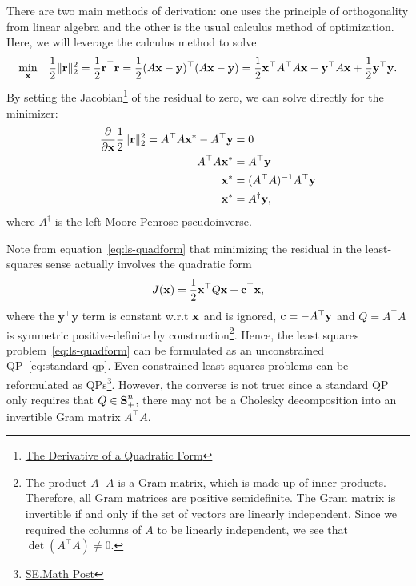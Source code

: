 \documentclass[10pt]{article}
\begin{document}
There are two main methods of derivation: one uses the principle of orthogonality from linear algebra and the other is the usual calculus method of optimization.
Here, we will leverage the calculus method to solve
\begin{equation}\label{eq:ls-quadform}
\underset{\mathbf{x}}{\min}\quad \frac{1}{2}\|\mathbf{r}\|^2_2 = \frac{1}{2}\mathbf{r}^\top\mathbf{r}
= \frac{1}{2}(A\mathbf{x}-\mathbf{y})^\top(A\mathbf{x}-\mathbf{y})
= \frac{1}{2} \mathbf{x}^\top A^\top A\mathbf{x} - \mathbf{y}^\top A\mathbf{x} + \frac{1}{2}\mathbf{y}^\top\mathbf{y}.
\end{equation}
By setting the Jacobian\footnote{\href{http://michael.orlitzky.com/articles/the_derivative_of_a_quadratic_form.xhtml}{The Derivative of a Quadratic Form}} of the residual to zero, we can solve directly for the minimizer:
\begin{align}\label{eq:ls-qp-jacobian}
\frac{\partial}{\partial\mathbf{x}}\frac{1}{2}\|\mathbf{r}\|^2_2 = A^\top A\mathbf{x}^* - A^\top\mathbf{y} &= 0 \\
A^\top A\mathbf{x}^* &= A^\top\mathbf{y} \nonumber\\
\mathbf{x}^* &= (A^\top A)^{-1}A^\top\mathbf{y} \nonumber\\
\mathbf{x}^* &= A^\dagger\mathbf{y}, \nonumber
\end{align}
where $A^\dagger$ is the left Moore-Penrose pseudoinverse.

Note from equation~\eqref{eq:ls-quadform} that minimizing the residual in the least-squares sense actually involves the quadratic form
\begin{equation}
J(\mathbf{x}) = \frac{1}{2}\mathbf{x}^\top Q\mathbf{x} + \mathbf{c}^\top\mathbf{x},
\end{equation}
where the $\mathbf{y}^\top\mathbf{y}$ term is constant w.r.t $\mathbf{x}$ and is ignored, $\mathbf{c}=-A^\top\mathbf{y}$ and $Q=A^\top A$ is symmetric positive-definite by construction\footnote{The product $A^\top A$ is a Gram matrix, which is made up of inner products. Therefore, all Gram matrices are positive semidefinite. The Gram matrix is invertible if and only if the set of vectors are linearly independent. Since we required the columns of $A$ to be linearly independent, we see that $\det(A^\top A)\neq0$.}.
Hence, the least squares problem~\eqref{eq:ls-quadform} can be formulated as an unconstrained QP~\eqref{eq:standard-qp}.
Even constrained least squares problems can be reformulated as QPs\footnote{\href{https://math.stackexchange.com/questions/869204/are-constrained-linear-least-squares-and-quadratic-programming-the-same-thin}{SE.Math Post}}.
However, the converse is not true: since a standard QP only requires that $Q\in{\mbox{\bf S}}^n_+$, there may not be a Cholesky decomposition into an invertible Gram matrix $A^\top A$.
\end{document}
